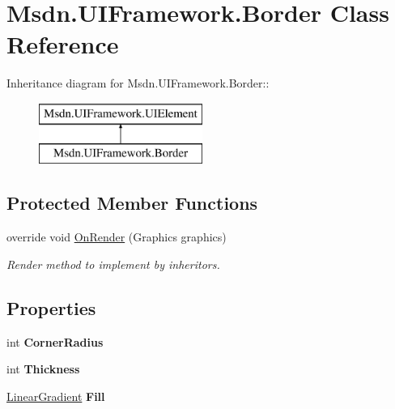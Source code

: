 \hypertarget{class_msdn_1_1_u_i_framework_1_1_border}{
\section{Msdn.UIFramework.Border Class Reference}
\label{class_msdn_1_1_u_i_framework_1_1_border}
}
Inheritance diagram for Msdn.UIFramework.Border::\begin{figure}[H]
\begin{center}
\leavevmode
\includegraphics[height=2cm]{class_msdn_1_1_u_i_framework_1_1_border}
\end{center}
\end{figure}
\subsection*{Protected Member Functions}
\begin{DoxyCompactItemize}
\item 
override void \hyperlink{class_msdn_1_1_u_i_framework_1_1_border_a69a519c3ec33e09fc09de0e6100414fe}{OnRender} (Graphics graphics)
\begin{DoxyCompactList}\small\item\em Render method to implement by inheritors. \item\end{DoxyCompactList}\end{DoxyCompactItemize}
\subsection*{Properties}
\begin{DoxyCompactItemize}
\item 
\hypertarget{class_msdn_1_1_u_i_framework_1_1_border_a80fd1fab4f288c72e03a9c8b07ff24ce}{
int {\bfseries CornerRadius}}
\label{class_msdn_1_1_u_i_framework_1_1_border_a80fd1fab4f288c72e03a9c8b07ff24ce}

\item 
\hypertarget{class_msdn_1_1_u_i_framework_1_1_border_abc5205a2e7c11dbe67afdb73892b823b}{
int {\bfseries Thickness}}
\label{class_msdn_1_1_u_i_framework_1_1_border_abc5205a2e7c11dbe67afdb73892b823b}

\item 
\hypertarget{class_msdn_1_1_u_i_framework_1_1_border_a22ce950156dddf984e47e16098bfdc54}{
\hyperlink{class_msdn_1_1_u_i_framework_1_1_linear_gradient}{LinearGradient} {\bfseries Fill}}
\label{class_msdn_1_1_u_i_framework_1_1_border_a22ce950156dddf984e47e16098bfdc54}

\end{DoxyCompactItemize}


